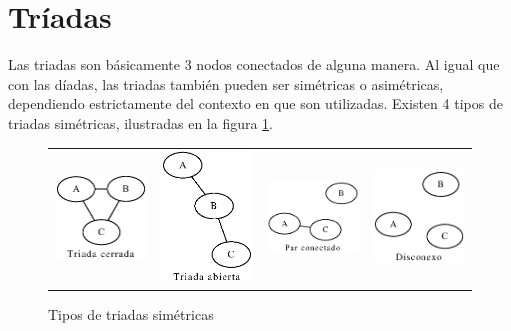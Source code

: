 \section{Tríadas}

Las triadas son básicamente 3 nodos conectados de alguna manera. Al igual que con las díadas, las triadas también pueden ser simétricas o asimétricas, dependiendo estrictamente del contexto en que son utilizadas. Existen 4 tipos de triadas simétricas, ilustradas en la figura \ref{fig:tipos_triadas_simetricas}.

\begin{figure}[!htb]
  \begin{center}
      \begin{tabular}{m{3cm}|m{3cm}|m{3cm}|m{3cm}}
        \includegraphics[width=3cm]{./imagenes/triada_simetrica_1.eps} & 
        \includegraphics[width=3cm]{./imagenes/triada_simetrica_2.eps} & 
        \includegraphics[width=3cm]{./imagenes/triada_simetrica_3.eps} & 
        \includegraphics[width=3cm]{./imagenes/triada_simetrica_4.eps}\\
      \end{tabular}
    \caption{Tipos de triadas simétricas}
    \label{fig:tipos_triadas_simetricas}
  \end{center}
\end{figure}

